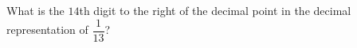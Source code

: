 What is the $14$th digit to the right of the decimal point in the decimal representation of $\dfrac{1}{13}$?
